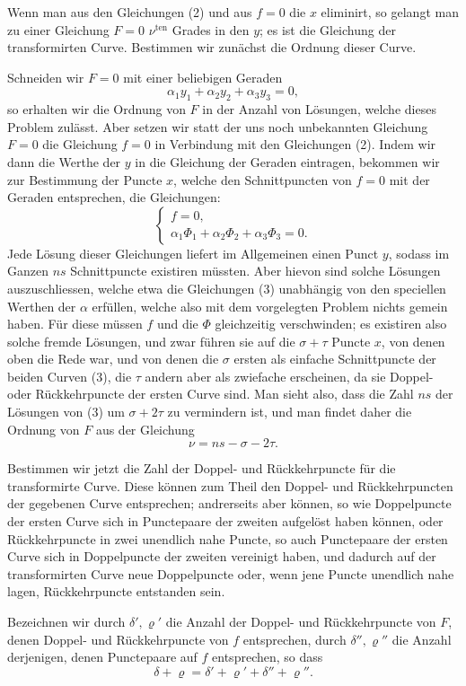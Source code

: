 \documentclass[10pt]{article}
\begin{document}
Wenn man aus den Gleichungen (2) und aus \(f=0\) die \(x\) eliminirt, so gelangt man zu einer Gleichung \(F=0\) \(\nu^{\text{ten}}\) Grades in den \(y\); es ist die Gleichung der transformirten Curve. Bestimmen wir zunächst die Ordnung dieser Curve.

Schneiden wir \(F=0\) mit einer beliebigen Geraden
\[
\alpha_1y_1+\alpha_2y_2+\alpha_3y_3=0,
\]
so erhalten wir die Ordnung von \(F\) in der Anzahl von Lösungen, welche dieses Problem zulässt. Aber setzen wir statt der uns noch unbekannten Gleichung \(F=0\) die Gleichung \(f=0\) in Verbindung mit den Gleichungen (2). Indem wir dann die Werthe der \(y\) in die Gleichung der Geraden eintragen, bekommen wir zur Bestimmung der Puncte \(x\), welche den Schnittpuncten von \(f=0\) mit der Geraden entsprechen, die Gleichungen:
\[
\tag{3}
\begin{cases}
f=0,\\
\alpha_1\Phi_1+\alpha_2\Phi_2+\alpha_3\Phi_3=0.
\end{cases}
\]
Jede Lösung dieser Gleichungen liefert im Allgemeinen einen Punct \(y\), sodass im Ganzen \(ns\) Schnittpuncte existiren müssten. Aber hievon sind solche Lösungen auszuschliessen, welche etwa die Gleichungen (3) unabhängig von den speciellen Werthen der \(\alpha\) erfüllen, welche also mit dem vorgelegten Problem nichts gemein haben. Für diese müssen \(f\) und die \(\Phi\) gleichzeitig verschwinden; es existiren also solche fremde Lösungen, und zwar führen sie auf die \(\sigma+\tau\) Puncte \(x\), von denen oben die Rede war, und von denen die \(\sigma\) ersten als einfache Schnittpuncte der beiden Curven (3), die \(\tau\) andern aber als zwiefache erscheinen, da sie Doppel- oder Rückkehrpuncte der ersten Curve sind. Man sieht also, dass die Zahl \(ns\) der Lösungen von (3) um \(\sigma+2\tau\) zu vermindern ist, und man findet daher die Ordnung von \(F\) aus der Gleichung
\[
\nu=ns-\sigma-2\tau.
\]

Bestimmen wir jetzt die Zahl der Doppel- und Rückkehrpuncte für die transformirte Curve. Diese können zum Theil den Doppel- und Rückkehrpuncten der gegebenen Curve entsprechen; andrerseits aber können, so wie Doppelpuncte der ersten Curve sich in Punctepaare der zweiten aufgelöst haben können, oder Rückkehrpuncte in zwei unendlich nahe Puncte, so auch Punctepaare der ersten Curve sich in Doppelpuncte der zweiten vereinigt haben, und dadurch auf der transformirten Curve neue Doppelpuncte oder, wenn jene Puncte unendlich nahe lagen, Rückkehrpuncte entstanden sein.

Bezeichnen wir durch \(\delta',\varrho'\) die Anzahl der Doppel- und Rückkehrpuncte von \(F\), denen Doppel- und Rückkehrpuncte von \(f\) entsprechen, durch \(\delta'',\varrho''\) die Anzahl derjenigen, denen Punctepaare auf \(f\) entsprechen, so dass
\[
\delta+\varrho=\delta'+\varrho'+\delta''+\varrho''.
\]
\end{document}
